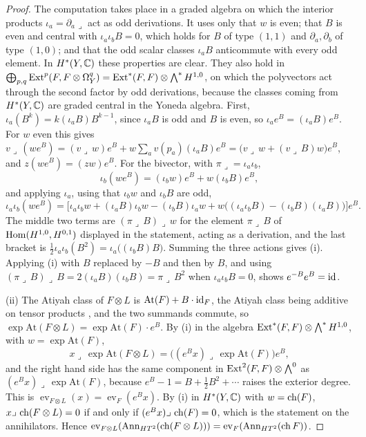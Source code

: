 \begin{proof}
The computation takes place in a graded algebra on which the interior
products $\iota_{a}=\partial_{a}\lrcorner$ act as odd derivations. It uses
only that $w$ is even; that $B$ is even and central with
$\iota_{a}\iota_{b}B=0$, which holds for $B$ of type $(1,1)$ and
$\partial_{a},\partial_{b}$ of type $(1,0)$; and that the odd scalar classes
$\iota_{a}B$ anticommute with every odd element. In $H^{*}(Y,\mathbb{C})$ these
properties are clear. They also hold in
$\bigoplus_{p,q}\operatorname{Ext}^{p}(F,F\otimes\Omega^{q}_{Y})=\operatorname{Ext}^{*}(F,F)\otimes
\bigwedge^{*}H^{1,0}$, on which the polyvectors act through the second factor
by odd derivations, because the classes coming from $H^{*}(Y,\mathbb{C})$ are graded
central in the Yoneda algebra. First, $\iota_{a}(B^{k})=k(\iota_{a}B)B^{k-1}$,
since $\iota_{a}B$ is odd and $B$ is even, so
$\iota_{a}e^{B}=(\iota_{a}B)e^{B}$. For $w$ even this gives
$v\lrcorner\,(we^{B})=(v\lrcorner\,w)e^{B}+w\sum_{a}v(p_{a})(\iota_{a}B)e^{B}
=\bigl(v\lrcorner\,w+(v\lrcorner\,B)w\bigr)e^{B}$, and
$z(we^{B})=(zw)e^{B}$. For the bivector, with $\pi\lrcorner=\iota_{a}\iota_{b}$,
\[
  \iota_{b}(we^{B})=(\iota_{b}w)e^{B}+w(\iota_{b}B)e^{B},
\]
and applying $\iota_{a}$, using that $\iota_{b}w$ and $\iota_{b}B$ are odd,
\[
  \iota_{a}\iota_{b}(we^{B})
  =\bigl[\iota_{a}\iota_{b}w
   +(\iota_{a}B)\iota_{b}w-(\iota_{b}B)\iota_{a}w
   +w\bigl((\iota_{a}\iota_{b}B)-(\iota_{b}B)(\iota_{a}B)\bigr)\bigr]e^{B}.
\]
The middle two terms are $(\pi\lrcorner\,B)\lrcorner\,w$ for the element
$\pi\lrcorner\,B$ of $\operatorname{Hom}(H^{1,0},H^{0,1})$ displayed in the statement, acting
as a derivation, and the last bracket is
$\tfrac12\iota_{a}\iota_{b}(B^{2})=\iota_{a}\bigl((\iota_{b}B)B\bigr)$.
Summing the three actions gives (i). Applying (i) with $B$ replaced by $-B$
and then by $B$, and using
$(\pi\lrcorner\,B)\lrcorner\,B=2(\iota_{a}B)(\iota_{b}B)=\pi\lrcorner\,B^{2}$
when $\iota_{a}\iota_{b}B=0$, shows $e^{-B}e^{B}=\operatorname{id}$.

(ii) The Atiyah class of $F\otimes L$ is $\mathrm{At}(F)+B\cdot\operatorname{id}_{F}$,
the Atiyah class being additive on tensor products \cite[Section 3]{BF03},
and the two summands commute, so
$\exp\mathrm{At}(F\otimes L)=\exp\mathrm{At}(F)\cdot e^{B}$. By (i) in the
algebra $\operatorname{Ext}^{*}(F,F)\otimes\bigwedge^{*}H^{1,0}$, with $w=\exp\mathrm{At}(F)$,
\[
  x\lrcorner\,\exp\mathrm{At}(F\otimes L)
  =\bigl((e^{B}x)\lrcorner\,\exp\mathrm{At}(F)\bigr)e^{B},
\]
and the right hand side has the same component in
$\operatorname{Ext}^{2}(F,F)\otimes\bigwedge^{0}$ as $(e^{B}x)\lrcorner\,\exp\mathrm{At}(F)$,
because $e^{B}-1=B+\tfrac12B^{2}+\cdots$ raises the exterior degree. This is
$\operatorname{ev}_{F\otimes L}(x)=\operatorname{ev}_{F}(e^{B}x)$. By (i) in
$H^{*}(Y,\mathbb{C})$ with $w=\operatorname{ch}(F)$, $x\lrcorner\,\operatorname{ch}(F\otimes L)=0$ if and only
if $(e^{B}x)\lrcorner\,\operatorname{ch}(F)=0$, which is the statement on the annihilators.
Hence $\operatorname{ev}_{F\otimes L}(\operatorname{Ann}_{HT^{2}}(\operatorname{ch}(F\otimes L)))
=\operatorname{ev}_{F}(\operatorname{Ann}_{HT^{2}}(\operatorname{ch} F))$.
\end{proof}

